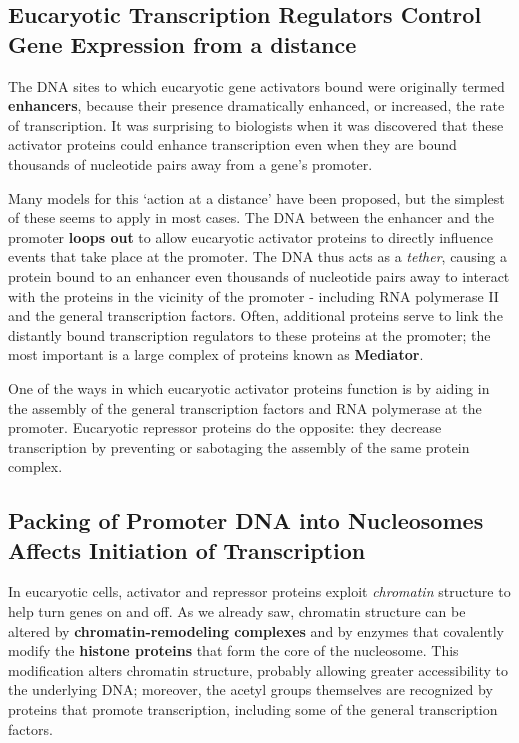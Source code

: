 \subsection{Eucaryotic Transcription Regulators Control Gene Expression from a distance}

The DNA sites to which eucaryotic gene activators bound were originally termed \textbf{enhancers},
because their presence dramatically enhanced, or increased, the rate of
transcription. It was surprising to biologists when it was discovered
that these activator proteins could enhance transcription even when
they are bound thousands of nucleotide pairs away from a gene’s promoter.

Many models for this ‘action at a distance’ have been proposed, but
the simplest of these seems to apply in most cases. The DNA between
the enhancer and the promoter \textbf{loops out} to allow eucaryotic activator
proteins to directly influence events that take place at the promoter.
The DNA thus acts as a \textit{tether}, causing a protein bound to
an enhancer even thousands of nucleotide pairs away to interact with
the proteins in the vicinity of the promoter - including RNA polymerase
II and the general transcription factors. Often, additional proteins serve
to link the distantly bound transcription regulators
to these proteins at the promoter; the most important is a large complex
of proteins known as \textbf{Mediator}. 

One of the ways in
which eucaryotic activator proteins function is by aiding in the assembly
of the general transcription factors and RNA polymerase at the promoter.
Eucaryotic repressor proteins do the opposite: they decrease transcription
by preventing or sabotaging the assembly of the same protein complex.

\subsection{Packing of Promoter DNA into Nucleosomes Affects Initiation of Transcription}

In eucaryotic cells, activator and repressor proteins exploit \textit{chromatin}
structure to help turn genes on and off. As we already saw, chromatin
structure can be altered by \textbf{chromatin-remodeling complexes} and by
enzymes that covalently modify the \textbf{histone proteins} that form the core
of the nucleosome. This modification alters chromatin structure,
probably allowing greater accessibility to the underlying DNA; moreover,
the acetyl groups themselves are recognized by proteins that promote
transcription, including some of the general transcription factors.


